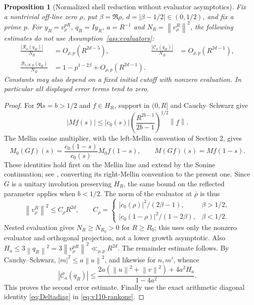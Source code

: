 \documentclass[11pt]{article}
\newtheorem{proposition}[theorem]{Proposition}
\theoremstyle{remark}
\newcommand{\norm}[1]{\left\lVert #1\right\rVert}
\begin{document}
\begin{proposition}[Normalized shell reduction without evaluator asymptotics]\label{prop:v110-normalized-shell}
Fix a nontrivial off-line zero $\rho$, put
$\beta=\Re\rho$, $d=|\beta-1/2|\in(0,1/2)$, and fix a prime $p$.
For $y_R=v_\rho^{pR}$, $q_R=Iy_R$, $a=R^{-1}$ and
$N_R=\norm{v_\rho^R}^2$, the following estimates do not use
Assumption~\ref{ass:evaluators}:
\begin{align}
 \frac{|\mathcal R_a(q_R)|}{N_R}&=O_{\rho,p}(R^{2d-5}),
 &\frac{|\mathcal C_a(q_R)|}{N_R}&=O_{\rho,p}(R^{2d-1}),
 \label{eq:v110-normalized-errors}\\
 \frac{\mathcal B_{1/R,p}(q_R)}{N_R}
 &=1-p^{1-2\beta}+O_{\rho,p}(R^{2d-1}).
 \label{eq:v110-shell-limit}
\end{align}
Constants may also depend on a fixed initial cutoff with nonzero
evaluation. In particular all displayed error terms tend to zero.
\end{proposition}
\begin{proof}
For $\Re s=b>1/2$ and $f\in H_R$, support in $(0,R]$ and
Cauchy--Schwarz give
\[
 |M f(s)|\le |c_0(s)|\left(\frac{R^{2b-1}}{2b-1}\right)^{1/2}\norm f.
\]
The Mellin cosine multiplier, with the left-Mellin convention of
Section 2, gives
\[
 M_0(Gf)(s)=\frac{c_0(1-s)}{c_0(s)}M_0f(1-s),
 \qquad M(Gf)(s)=M f(1-s).
\]
These identities hold first on the Mellin line and extend by the
Sonine continuation; see \cite[\S1, (7)]{Burnol2004}, converting its
right-Mellin convention to the present one. Since $G$ is a unitary
involution preserving $H_R$, the same bound on the reflected parameter
applies when $b<1/2$. The norm of the evaluator at $\bar\rho$ is thus
\[
 \norm{v_\rho^R}^2\le C_\rho R^{2d},\qquad
 C_\rho=
 \begin{cases}
 |c_0(\rho)|^2/(2\beta-1),&\beta>1/2,\\
 |c_0(1-\rho)|^2/(1-2\beta),&\beta<1/2.
 \end{cases}
\]
Nested evaluation gives $N_R\ge N_{R_0}>0$ for $R\ge R_0$;
this uses only the nonzero evaluator and orthogonal projection, not
a lower growth asymptotic. Also
$H_a\le3\norm{q_R}^2=3\norm{v_\rho^{pR}}^2\ll_{\rho,p}R^{2d}$.
The remainder estimate follows. By Cauchy--Schwarz,
$|m|^2\le a\norm u^2$, and likewise for $n,m'$, whence
\[
 |\mathcal C_a(q_R)|\le
 \frac{2a(\norm u^2+\norm v^2)+4a^2H_a}{1-4a^2}.
\]
This proves the second error estimate. Finally use the exact arithmetic
diagonal identity \eqref{eq:Deltadiag} in \eqref{eq:v110-rankone}.
\end{proof}
\end{document}
